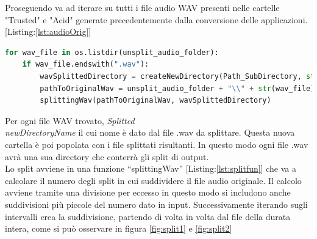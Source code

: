 Proseguendo va ad iterare su tutti i file audio WAV presenti nelle cartelle "Trusted" e "Acid" generate precedentemente dalla conversione delle applicazioni. [Listing:\ref{lst:audioOrig}]

\begin{lstlisting}[language=Python, caption=Iteration over whole audios, label = lst:audioOrig]
for wav_file in os.listdir(unsplit_audio_folder):
    if wav_file.endswith(".wav"):
        wavSplittedDirectory = createNewDirectory(Path_SubDirectory, str(wav_file))
        pathToOriginalWav = unsplit_audio_folder + "\\" + str(wav_file) 
        splittingWav(pathToOriginalWav, wavSplittedDirectory)
\end{lstlisting}


Per ogni file WAV trovato, \textit{Splitted\\newDirectoryName} il cui nome è dato dal file .wav da splittare. Questa nuova cartella è poi popolata con i file splittati risultanti. In questo modo ogni file .wav avrà una sua directory che conterrà gli split di output.\\
Lo split avviene in una funzione “splittingWav” [Listing:\ref{lst:splitfun}] che va a calcolare il numero degli split in cui suddividere il file audio originale. Il calcolo avviene tramite una divisione per eccesso in questo modo si includono anche suddivisioni più piccole del numero dato in input. Successivamente iterando sugli intervalli crea la suddivisione, partendo di volta in volta dal file della durata intera, come si può osservare in figura \ref{fig:split1} e \ref{fig:split2}
